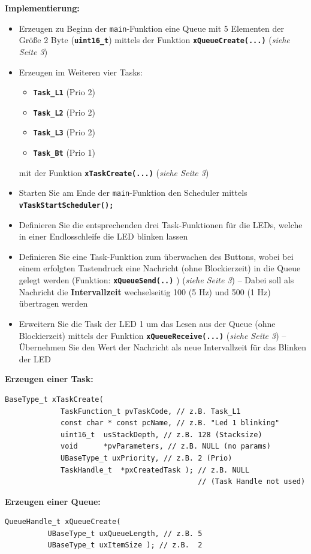 \documentclass[
    fontsize=12pt,                      %
    paper=a4,                           %
    twoside=off,                       %
    DIV=15,                             %
    BCOR=12mm,                          %
    headings=normal,                    %
    headsepline=false,                   %
    footsepline=false,                  %
    headinclude=true,                   %
    footinclude=false,                  %
    toc=listof,                         %
    toc=bib,                            %
    chapterprefix=false,                %
    appendixprefix=false,               %
    numbers=noendperiod,                %
    captions=tableabove,                %
    footnotes=multiple,                 %
    bibliography=oldstyle,              %
    draft=false,                        %
]{scrreprt}
\newcommand{\Farbcode}[1]{\texttt{\textbf{\textcolor{myred}{#1}}}}
\begin{document}
\noindent
\textbf{Implementierung:}

\noindent
\begin{itemize}
\item Erzeugen zu Beginn der \texttt{main}-Funktion eine Queue mit 5 Elementen der Größe 2 Byte (\Farbcode{uint16\_t}) mittels der Funktion \Farbcode{xQueueCreate(...)} (\emph{siehe Seite 3})	
\item Erzeugen im Weiteren vier Tasks:
\begin{itemize}
	\item \Farbcode{Task\_L1} (Prio 2)
	\item \Farbcode{Task\_L2} (Prio 2)
	\item \Farbcode{Task\_L3} (Prio 2)
	\item \Farbcode{Task\_Bt} (Prio 1)
\end{itemize}
mit der Funktion \Farbcode{xTaskCreate(...)} (\emph{siehe Seite 3})
\item Starten Sie am Ende der \texttt{main}-Funktion den Scheduler mittels \\
\Farbcode{vTaskStartScheduler();}
\item Definieren Sie die entsprechenden drei Task-Funktionen für die LEDs, welche in einer Endlosschleife die LED blinken lassen
\item Definieren Sie eine Task-Funktion zum überwachen des Buttons, wobei bei einem erfolgten Tastendruck eine Nachricht (ohne Blockierzeit) in die Queue gelegt werden (Funktion: \Farbcode{xQueueSend(..)} ) (\emph{siehe Seite 3}) -- Dabei soll als Nachricht die \textbf{Intervallzeit} wechselseitig 100 (5 Hz) und 500 (1 Hz) übertragen werden
\item Erweitern Sie die Task der LED 1 um das Lesen aus der Queue (ohne Blockierzeit) mittels der Funktion \Farbcode{xQueueReceive(...)} (\emph{siehe Seite 3}) -- Übernehmen Sie den Wert der Nachricht als neue Intervallzeit für das Blinken der LED

\end{itemize}

\newpage
\noindent
\textbf{Erzeugen einer Task:}
\begin{lstlisting}[frame=single,  label=LST_MyCam]
BaseType_t xTaskCreate(
             TaskFunction_t pvTaskCode, // z.B. Task_L1
             const char * const pcName, // z.B. "Led 1 blinking"
             uint16_t  usStackDepth, // z.B. 128 (Stacksize)
             void      *pvParameters, // z.B. NULL (no params)
             UBaseType_t uxPriority, // z.B. 2 (Prio)
             TaskHandle_t  *pxCreatedTask ); // z.B. NULL 
                                             // (Task Handle not used)
\end{lstlisting}
\vskip 1cm
\textbf{Erzeugen einer Queue:}
\begin{lstlisting}[frame=single,  label=LST_MyCam]
	QueueHandle_t xQueueCreate( 
	      UBaseType_t uxQueueLength, // z.B. 5 
	      UBaseType_t uxItemSize ); // z.B.  2
\end{lstlisting}
\end{document}
